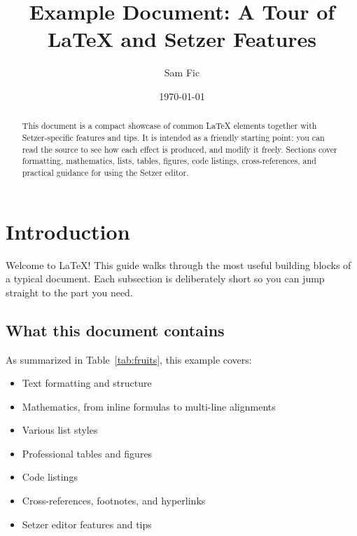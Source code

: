\documentclass[11pt]{article}
\title{Example Document: A Tour of \LaTeX{} and Setzer Features}
\author{Sam Fic}
\date{\today}
\theoremstyle{definition}
\theoremstyle{plain}
\begin{document}
\maketitle
\thispagestyle{empty}

\clearpage

\tableofcontents
\newpage

\begin{abstract}
This document is a compact showcase of common \LaTeX{} elements
together with Setzer-specific features and tips.
It is intended as a friendly starting point: you can read the source
to see how each effect is produced, and modify it freely.
Sections cover formatting, mathematics, lists, tables, figures,
code listings, cross-references, and practical guidance for using
the Setzer editor.
\end{abstract}

\section{Introduction}
\label{sec:intro}

Welcome to \LaTeX{}!
This guide walks through the most useful building blocks of a typical
document.
Each subsection is deliberately short so you can jump straight to the
part you need.

\subsection{What this document contains}
\label{sec:intro:contains}

As summarized in Table~\ref{tab:fruits}, this example covers:

\begin{itemize}[noitemsep]
    \item Text formatting and structure
    \item Mathematics, from inline formulas to multi-line alignments
    \item Various list styles
    \item Professional tables and figures
    \item Code listings
    \item Cross-references, footnotes, and hyperlinks
    \item Setzer editor features and tips
\end{itemize}

\end{document}
